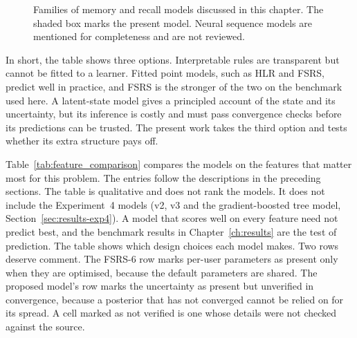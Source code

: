\begin{figure}[htbp]
  \centering
  
  \caption{Families of memory and recall models discussed in this chapter. The shaded box marks the present
    model. Neural sequence models are mentioned for completeness and are not reviewed.}
  \label{fig:tk_taxonomy}
\end{figure}

In short, the table shows three options. Interpretable rules are transparent but cannot be fitted to a
learner. Fitted point models, such as HLR and FSRS, predict well in practice, and FSRS is the stronger of the two
on the benchmark used here. A latent-state model gives a principled account of the state and its uncertainty,
but its inference is costly and must pass convergence checks before its predictions can be trusted. The present
work takes the third option and tests whether its extra structure pays off.

Table~\ref{tab:feature_comparison} compares the models on the features that matter most for this problem. The
entries follow the descriptions in the preceding sections. The table is qualitative and does not rank the
models. It does not include the Experiment~4 models (v2, v3 and the gradient-boosted tree model, Section~\ref{sec:results-exp4}). A model that scores well on every feature need not predict best, and the benchmark results in
Chapter~\ref{ch:results} are the test of prediction. The table shows which design choices each model makes.
Two rows deserve comment. The FSRS-6 row marks per-user parameters as present only when they are optimised,
because the default parameters are shared. The proposed model's row marks the uncertainty as present but
unverified in convergence, because a posterior that has not converged cannot be relied on for its spread. A cell marked as not verified is one whose
details were not checked against the source.

